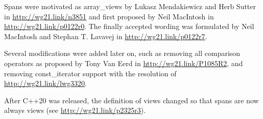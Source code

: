 Spans were motivated as array\_views by Lukasz Mendakiewicz and Herb Sutter in \url{http://wg21.link/n3851} and first proposed by Neil MacIntosh in \url{http://wg21.link/p0122r0}. The finally accepted wording was formulated by Neil MacIntosh and Stephan T. Lavavej in \url{http://wg21.link/p0122r7}.

Several modifications were added later on, such as removing all comparison operators as proposed by Tony Van Eerd in \url{http://wg21.link/P1085R2}, and removing const\_iterator support with the resolution of \url{http://wg21.link/lwg3320}.

After C++20 was released, the definition of views changed so that spans are now always views (see \url{http://wg21.link/p2325r3}).